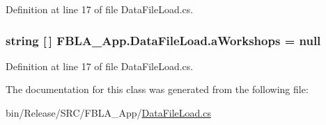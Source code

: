 Definition at line 17 of file Data\+File\+Load.\+cs.

\hypertarget{class_f_b_l_a___app_1_1_data_file_load_aaee123c1fcfe7efbbd2af7b5bf35c52a}{
\subsubsection[{a\+Workshops}]{\setlength{\rightskip}{0pt plus 5cm}string \mbox{[}$\,$\mbox{]} F\+B\+L\+A\+\_\+\+App.\+Data\+File\+Load.\+a\+Workshops = null}}\label{class_f_b_l_a___app_1_1_data_file_load_aaee123c1fcfe7efbbd2af7b5bf35c52a}


Definition at line 17 of file Data\+File\+Load.\+cs.



The documentation for this class was generated from the following file\+:\begin{DoxyCompactItemize}
\item 
bin/\+Release/\+S\+R\+C/\+F\+B\+L\+A\+\_\+\+App/\hyperlink{bin_2_release_2_s_r_c_2_f_b_l_a___app_2_data_file_load_8cs}{Data\+File\+Load.\+cs}\end{DoxyCompactItemize}
